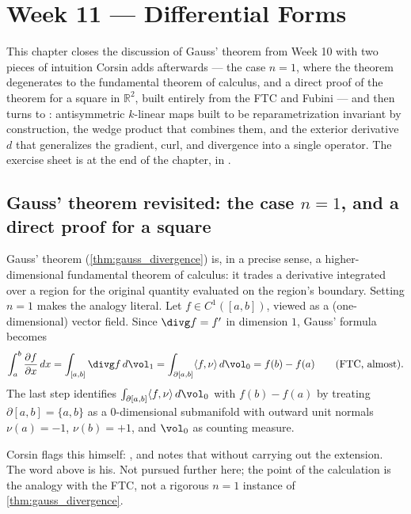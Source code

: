 \chapter{Week 11 --- Differential Forms}
\label{ch:week11}

This chapter closes the discussion of Gauss' theorem from Week 10 with two pieces of
intuition Corsin adds afterwards --- the case $n=1$, where the theorem degenerates to the
fundamental theorem of calculus, and a direct proof of the theorem for a square in
$\mathbb{R}^2$, built entirely from the FTC and Fubini --- and then turns to
: antisymmetric $k$-linear maps built to be reparametrization
invariant by construction, the wedge product that combines them, and the exterior derivative
$d$ that generalizes the gradient, curl, and divergence into a single operator. The exercise
sheet is at the end of the chapter, in .

\section{Gauss' theorem revisited: the case \texorpdfstring{$n=1$}{n=1}, and a direct proof
for a square}
\label{sec:gauss_intuition}

Gauss' theorem (\cref{thm:gauss_divergence}) is, in a precise sense, a higher-dimensional
fundamental theorem of calculus: it trades a derivative integrated over a region for the
original quantity evaluated on the region's boundary. Setting $n=1$ makes the analogy
literal. Let $f \in C^1([a,b])$, viewed as a (one-dimensional) vector field. Since $\divg f =
f'$ in dimension $1$, Gauss' formula becomes
\[\int_a^b \frac{\partial f}{\partial x}\,dx = \int_{[a,b]} \divg f\,d\vol_1
  = \int_{\partial[a,b]} \langle f,\nu\rangle\,d\vol_0
  = f(b) - f(a) \qquad \text{(FTC, almost).}\]
The last step identifies $\int_{\partial[a,b]} \langle f,\nu\rangle\,d\vol_0$ with $f(b)-f(a)$
by treating $\partial[a,b] = \{a,b\}$ as a $0$-dimensional submanifold with outward unit
normals $\nu(a) = -1$, $\nu(b) = +1$, and $\vol_0$ as counting measure.

\begin{ainote}
Corsin flags this himself: , and notes that  without carrying out the extension.
The word  above is his. Not pursued further here; the point of the calculation is
the analogy with the FTC, not a rigorous $n=1$ instance of \cref{thm:gauss_divergence}.
\end{ainote}

